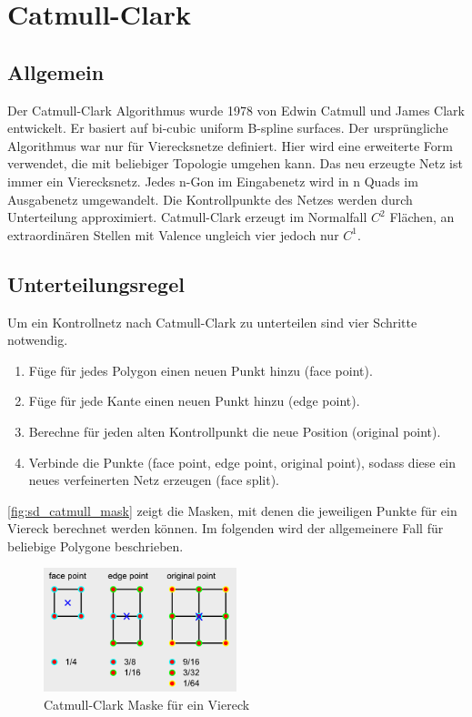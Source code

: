 \section{Catmull-Clark}

\subsection{Allgemein}

Der Catmull-Clark Algorithmus wurde 1978 von Edwin Catmull und James Clark entwickelt.
Er basiert auf bi-cubic uniform B-spline surfaces.
Der ursprüngliche Algorithmus war nur für Vierecksnetze definiert.
Hier wird eine erweiterte Form verwendet, die mit beliebiger Topologie umgehen kann.
Das neu erzeugte Netz ist immer ein Vierecksnetz.
Jedes n-Gon im Eingabenetz wird in n Quads
im Ausgabenetz umgewandelt.
Die Kontrollpunkte des Netzes werden durch Unterteilung approximiert.
Catmull-Clark erzeugt im Normalfall \(C^2\) Flächen,
an extraordinären Stellen mit Valence ungleich vier jedoch
nur \(C^1\).
\cite[S. 75ff]{Zorin.subdivcourse} \cite[S. 52ff]{Standford.24.07.2015}


\subsection{Unterteilungsregel}

Um ein Kontrollnetz nach Catmull-Clark zu unterteilen sind vier Schritte notwendig.
\begin{enumerate}
	\item Füge für jedes Polygon einen neuen Punkt hinzu (face point).
	\item Füge für jede Kante einen neuen Punkt hinzu (edge point).
	\item Berechne für jeden alten Kontrollpunkt die neue Position (original point).
	\item Verbinde die Punkte (face point, edge point, original point), sodass diese ein
	neues verfeinerten Netz erzeugen (face split).
\end{enumerate}

\autoref{fig:sd_catmull_mask} zeigt die Masken, mit denen die jeweiligen Punkte für ein Viereck berechnet werden können.
Im folgenden wird der allgemeinere Fall für beliebige Polygone beschrieben.
\begin{figure}
\centering
\includegraphics[width=0.5\textwidth]{content/media/sd_catmull_mask.png}
\caption{Catmull-Clark Maske für ein Viereck \cite{yoshihitoyagi.23.12.2015}}
\label{fig:sd_catmull_mask}
\end{figure}

